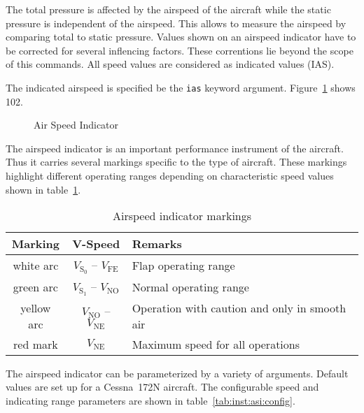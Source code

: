 The total pressure is affected by the airspeed of the aircraft while the static
pressure is independent of the airspeed. This allows to measure the airspeed by
comparing total to static pressure. Values shown on an airspeed indicator have
to be corrected for several inflencing factors. These correntions lie beyond
the scope of this commands. All speed values are considered as indicated values
(IAS).

The indicated airspeed is specified be the \texttt{ias} keyword argument.
Figure~\ref{fig:inst:asi:c172n} shows \SI{102}{\KIAS}.

\begin{figure}[!h]
\centering
{}
\caption{Air Speed Indicator}
\label{fig:inst:asi:c172n}
\end{figure}

The airspeed indicator is an important performance instrument of the aircraft.
Thus it carries several markings specific to the type of aircraft. These
markings highlight different operating ranges depending on characteristic speed
values shown in table~\ref{tab:inst:asi:markings}.

\begin{table}
\centering
\begin{tabular}{ccl}
\toprule
Marking    & V-Speed                             & Remarks                                       \\
\midrule
white arc  & $V_\mathrm{S_0}$ -- $V_\mathrm{FE}$ & Flap operating range                          \\
green arc  & $V_\mathrm{S_1}$ -- $V_\mathrm{NO}$ & Normal operating range                        \\
yellow arc & $V_\mathrm{NO}$  -- $V_\mathrm{NE}$ & Operation with caution and only in smooth air \\
red mark   & $V_\mathrm{NE}$                     & Maximum speed for all operations              \\
\bottomrule
\end{tabular}
\caption{Airspeed indicator markings}
\label{tab:inst:asi:markings}
\end{table}

The airspeed indicator can be parameterized by a variety of arguments. Default
values are set up for a Cessna~172N aircraft. The configurable speed and
indicating range parameters are shown in table~\ref{tab:inst:asi:config}.

